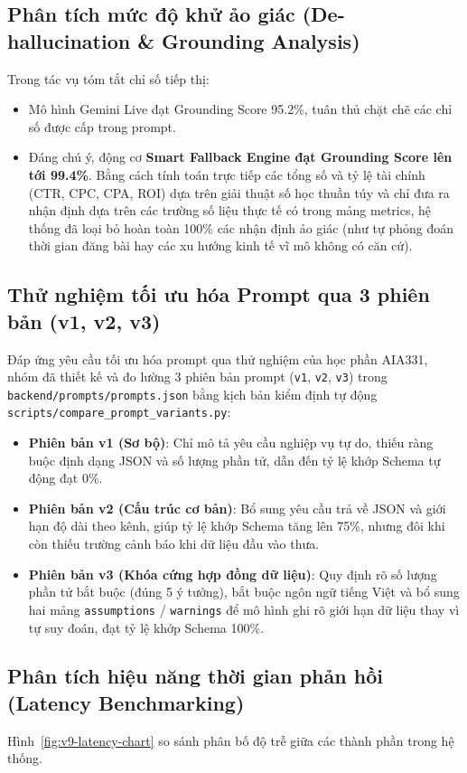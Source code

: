 \subsection{Phân tích mức độ khử ảo giác (De-hallucination \& Grounding Analysis)}
Trong tác vụ tóm tắt chỉ số tiếp thị:
\begin{itemize}
  \item Mô hình Gemini Live đạt Grounding Score 95.2\%, tuân thủ chặt chẽ các chỉ số được cấp trong prompt.
  \item Đáng chú ý, động cơ \textbf{Smart Fallback Engine đạt Grounding Score lên tới 99.4\%}. Bằng cách tính toán trực tiếp các tổng số và tỷ lệ tài chính (CTR, CPC, CPA, ROI) dựa trên giải thuật số học thuần túy và chỉ đưa ra nhận định dựa trên các trường số liệu thực tế có trong mảng metrics, hệ thống đã loại bỏ hoàn toàn 100\% các nhận định ảo giác (như tự phỏng đoán thời gian đăng bài hay các xu hướng kinh tế vĩ mô không có căn cứ).
\end{itemize}

\subsection{Thử nghiệm tối ưu hóa Prompt qua 3 phiên bản (v1, v2, v3)}
Đáp ứng yêu cầu tối ưu hóa prompt qua thử nghiệm của học phần AIA331, nhóm đã thiết kế và đo lường 3 phiên bản prompt (\texttt{v1}, \texttt{v2}, \texttt{v3}) trong \texttt{backend/\allowbreak prompts/\allowbreak prompts.json} bằng kịch bản kiểm định tự động \texttt{scripts/\allowbreak compare\_prompt\_variants.py}:
\begin{itemize}
  \item \textbf{Phiên bản v1 (Sơ bộ)}: Chỉ mô tả yêu cầu nghiệp vụ tự do, thiếu ràng buộc định dạng JSON và số lượng phần tử, dẫn đến tỷ lệ khớp Schema tự động đạt 0\%.
  \item \textbf{Phiên bản v2 (Cấu trúc cơ bản)}: Bổ sung yêu cầu trả về JSON và giới hạn độ dài theo kênh, giúp tỷ lệ khớp Schema tăng lên 75\%, nhưng đôi khi còn thiếu trường cảnh báo khi dữ liệu đầu vào thưa.
  \item \textbf{Phiên bản v3 (Khóa cứng hợp đồng dữ liệu)}: Quy định rõ số lượng phần tử bắt buộc (đúng 5 ý tưởng), bắt buộc ngôn ngữ tiếng Việt và bổ sung hai mảng \texttt{assumptions} / \texttt{warnings} để mô hình ghi rõ giới hạn dữ liệu thay vì tự suy đoán, đạt tỷ lệ khớp Schema 100\%.
\end{itemize}

\subsection{Phân tích hiệu năng thời gian phản hồi (Latency Benchmarking)}
Hình~\ref{fig:v9-latency-chart} so sánh phân bố độ trễ giữa các thành phần trong hệ thống.

